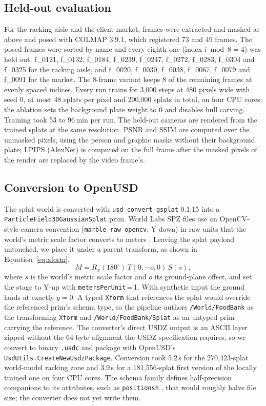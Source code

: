 \documentclass{article}
\newcommand{\code}[1]{\texttt{\small #1}}
\begin{document}
\subsection{Held-out evaluation}
For the racking aisle and the client market, frames were extracted and masked
as above and posed with COLMAP 3.9.1, which registered 73 and 49 frames. The
posed frames were sorted by name and every eighth one (index $i \bmod 8 = 4$)
was held out: f\_0121, f\_0132, f\_0184, f\_0239, f\_0247, f\_0272,
f\_0283, f\_0304 and f\_0325 for the racking aisle, and f\_0020, f\_0030,
f\_0038, f\_0067, f\_0079 and f\_0091 for the market. The 8-frame variant
keeps 8 of the remaining frames at evenly spaced indices. Every run trains for
3{,}000 steps at 480 pixels wide with seed 0, at most 48 splats per pixel and
200{,}000 splats in total, on four CPU cores; the ablation sets the background
plate weight to 0 and disables hull carving. Training took 53 to 96\,min per
run. The held-out cameras are rendered from the trained splats at the same
resolution. PSNR and SSIM are computed over the unmasked pixels, using the
person and graphic masks without their background plate; LPIPS (AlexNet) is
computed on the full frame after the masked pixels of the render are replaced
by the video frame's.

\subsection{Conversion to OpenUSD}
The splat world is converted with \code{usd-convert-gsplat} 0.1.15
\cite{usdconvertgsplat} into a
\code{ParticleField3DGaussianSplat} prim.
World Labs SPZ files use an OpenCV-style camera convention
(\code{marble\_raw\_opencv}, Y down) in raw units that the world's metric scale
factor converts to meters \cite{worldlabs_spz}. Leaving the splat payload untouched, we place it
under a parent transform, as shown in Equation~\ref{eq:xform},
\begin{equation} \label{eq:xform}
  M = R_x(180^\circ)\, T(0, -o, 0)\, S(s),
\end{equation}
where $s$ is the world's metric scale factor and $o$ its ground-plane offset,
and set the stage to Y-up with \code{metersPerUnit}\,=\,1. With synthetic
input the ground lands at exactly $y=0$. A typed \code{Xform} that references
the splat would override the referenced prim's schema type, so the pipeline
authors \code{/World/FoodBank} as the transforming \code{Xform} and
\code{/World/FoodBank/Splat} as an untyped prim carrying the reference. The
converter's direct USDZ output is an ASCII layer zipped without the 64-byte
alignment the USDZ specification requires, so we convert to binary
\code{.usdc} and package with OpenUSD's \code{UsdUtils.CreateNewUsdzPackage}.
Conversion took 5.2\,s for the 270{,}423-splat world-model racking zone and
3.9\,s for a 181{,}556-splat first version of the locally trained one on four
CPU cores. The schema
family defines half-precision companions to its attributes, such as
\code{positionsh} \cite{usd_particle_position}, that would roughly halve file
size; the converter does not yet write them.
\end{document}
